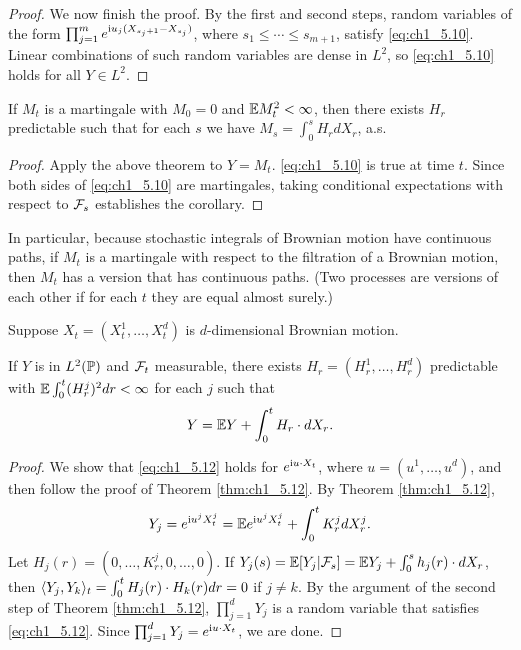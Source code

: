 \begin{proof}
We now finish the proof. By the first and second steps, random variables of the form $\prod_{j=1}^m e^{\im u_j(X_{s_j+1} - X_{s_j})}$, where $s_1 \leq \cdots \leq s_{m+1}$, satisfy \eqref{eq:ch1_5.10}. Linear combinations of such random variables are dense in $L^2$, so \eqref{eq:ch1_5.10} holds for all $Y \in L^2$.
\end{proof}

\begin{corollary}\label{cor:ch1_5.13}
If $M_t$ is a martingale with $M_0 = 0$ and $\E M_t^2 < \infty$, then there exists $H_r$ predictable such that for each $s$ we have $M_s = \int_0^s H_r dX_r$, a.s.
\end{corollary}

\begin{proof}
Apply the above theorem to $Y = M_t$. \eqref{eq:ch1_5.10} is true at time $t$. Since both sides of \eqref{eq:ch1_5.10} are martingales, taking conditional expectations with respect to $\FC_s$ establishes the corollary.
\end{proof}


In particular, because stochastic integrals of Brownian motion have continuous paths, if $M_t$ is a martingale with respect to the filtration of a Brownian motion, then $M_t$ has a version that has continuous paths. (Two processes are versions of each other if for each $t$ they are equal almost surely.)

Suppose $X_t = (X_t^1,\ldots,X_t^d)$ is $d$-dimensional Brownian motion.

\begin{corollary}\label{cor:ch1_5.14}
If $Y$ is in $L^2(\P)$ and $\FC_t$ measurable, there exists $H_r = (H_r^1,\ldots,H_r^d)$ predictable with $\E \int_0^t (H_r^j)^2dr < \infty$ for each $j$ such that
\begin{equation}\label{eq:ch1_5.12}
    Y = \E Y + \int_0^t H_r \cdot dX_r.
\end{equation}
\end{corollary}

\begin{proof}
We show that \eqref{eq:ch1_5.12} holds for $e^{\im u\cdot X_t}$, where $u = (u^1,\ldots,u^d)$, and then follow the proof of Theorem \ref{thm:ch1_5.12}. By Theorem \ref{thm:ch1_5.12},
\mpagebreak
\[
    Y_j = e^{\im u^jX_t^j} = \E e^{\im u^jX_t^j} + \int_0^t K_r^j dX_r^j.
\]
Let $H_j(r)=(0,\ldots,K_r^j,0,\ldots,0)$. If $Y_j(s) = \E[Y_j\mid \FC_s] = \E Y_j + \int_0^s h_j(r) \cdot dX_r$, then $\lrang{Y_j,Y_k}_t = \int_0^t H_j(r) \cdot H_k(r)dr = 0$ if $j \neq k$. By the argument of the second step of Theorem \ref{thm:ch1_5.12}, $\prod_{j=1}^d Y_j$ is a random variable that satisfies \eqref{eq:ch1_5.12}. Since $\prod_{j=1}^d Y_j = e^{\im u\cdot X_t}$, we are done.
\end{proof}

